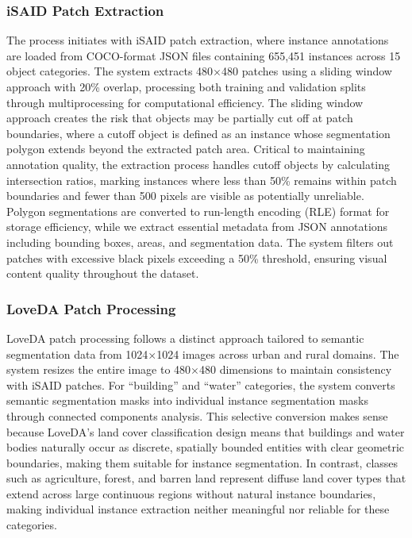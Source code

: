 \subsubsection{iSAID Patch Extraction}
The process initiates with iSAID patch extraction, where instance annotations are loaded from COCO-format JSON files containing 655,451 instances across 15 object categories. The system extracts 480$\times$480 patches using a sliding window approach with 20\% overlap, processing both training and validation splits through multiprocessing for computational efficiency. The sliding window approach creates the risk that objects may be partially cut off at patch boundaries, where a cutoff object is defined as an instance whose segmentation polygon extends beyond the extracted patch area. Critical to maintaining annotation quality, the extraction process handles cutoff objects by calculating intersection ratios, marking instances where less than 50\% remains within patch boundaries and fewer than 500 pixels are visible as potentially unreliable. Polygon segmentations are converted to run-length encoding (RLE) format for storage efficiency, while we extract essential metadata from JSON annotations including bounding boxes, areas, and segmentation data. The system filters out patches with excessive black pixels exceeding a 50\% threshold, ensuring visual content quality throughout the dataset.

\subsubsection{LoveDA Patch Processing}
LoveDA patch processing follows a distinct approach tailored to semantic segmentation data from 1024$\times$1024 images across urban and rural domains. The system resizes the entire image to 480$\times$480 dimensions to maintain consistency with iSAID patches. For ``building'' and ``water'' categories, the system converts semantic segmentation masks into individual instance segmentation masks through connected components analysis. This selective conversion makes sense because LoveDA's land cover classification design means that buildings and water bodies naturally occur as discrete, spatially bounded entities with clear geometric boundaries, making them suitable for instance segmentation. In contrast, classes such as agriculture, forest, and barren land represent diffuse land cover types that extend across large continuous regions without natural instance boundaries, making individual instance extraction neither meaningful nor reliable for these categories.

